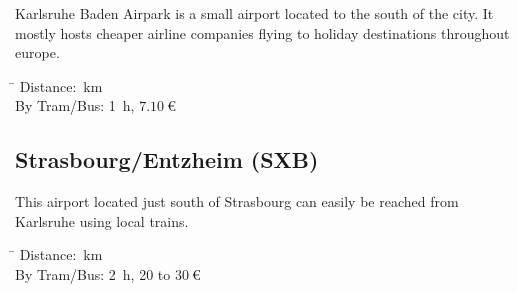 \begin{multicols}{2}
Karlsruhe Baden Airpark is a small airport located to the south of the city. It
mostly hosts cheaper airline companies flying to holiday destinations
throughout europe.

\begin{tabbing}
\hspace*{2.5cm} \= \kill
Distance: \,km \\
By Tram/Bus: \> \SI{1}{\hour}, $\SI{7.10}{\euro}$ \\
\end{tabbing}

\subsection{Strasbourg/Entzheim (SXB)}

This airport located just south of Strasbourg can easily be reached from Karlsruhe
using local trains.

\begin{tabbing}
\hspace*{2.5cm} \= \kill
Distance: \,km \\
By Tram/Bus: \> \SI{2}{\hour}, 20 to $\SI{30}{\euro}$ \\
\end{tabbing}

\end{multicols}

